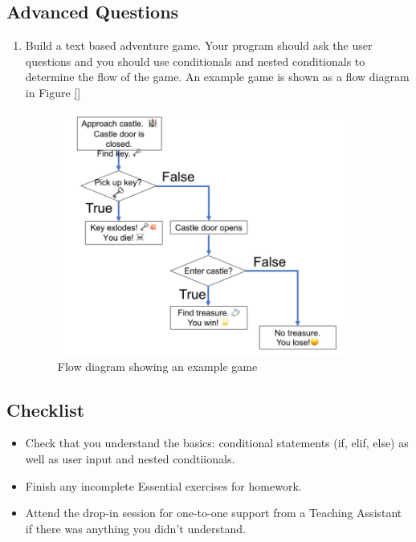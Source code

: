 \documentclass[11pt]{report}
\begin{document}
\subsection*{Advanced Questions}

\begin{enumerate}[label=(\Alph*)]
    
    \item Build a text based adventure game. Your program should ask the user questions and you should use conditionals and nested conditionals to determine the flow of the game. An example game is shown as a flow diagram in Figure \ref{}
    
    \begin{figure}[!h]
        \centering
        \includegraphics[height=8cm]{adventure}
        \caption{Flow diagram showing an example game}
        \label{fig:advanture}
\end{figure}
    
\end{enumerate}



\subsection*{Checklist}
\begin{itemize}
	\item Check that you understand the basics: conditional statements (if, elif, else) as well as user input and nested condtiionals.
	\item Finish any incomplete Essential exercises for homework. 
	\item Attend the drop-in session for one-to-one support from a Teaching Assistant if there was anything you didn't understand.
\end{itemize}
\end{document}
